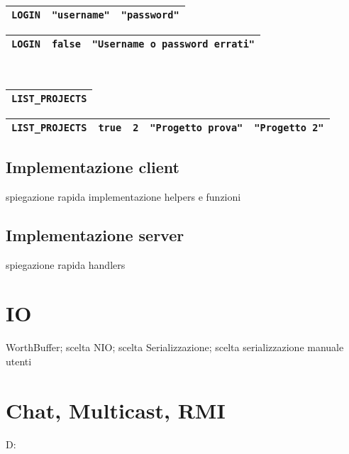 \documentclass[a4paper,11pt] {article}
\begin{document}
\begin{table}[H]
	\begin{tabular}{|l|l|l|}
		\hline
		\texttt{LOGIN} & \texttt{"username"} & \texttt{"password"} \\ \hline
	\end{tabular}
	\begin{flushright}
	\begin{tabular}{|l|l|l|}
		\hline
		\texttt{LOGIN} & \texttt{false} & \texttt{"Username o password errati"} \\ \hline
	\end{tabular}
	\end{flushright}
	~\\
	\begin{tabular}{|l|}
		\hline
		\texttt{LIST_PROJECTS} \\ \hline
	\end{tabular}
	\begin{flushright}
	\begin{tabular}{|l|l|l|l|l|}
		\hline
		\texttt{LIST_PROJECTS} & \texttt{true} & \texttt{2} & \texttt{"Progetto prova"} & \texttt{"Progetto 2"} \\ \hline
	\end{tabular}
	\end{flushright}
\end{table}

\subsection*{Implementazione client}

spiegazione rapida implementazione helpers e funzioni

\subsection*{Implementazione server}

spiegazione rapida handlers

\section*{IO}

WorthBuffer; scelta NIO; scelta Serializzazione; scelta serializzazione manuale utenti

\section*{Chat, Multicast, RMI}

D:
\end{document}
